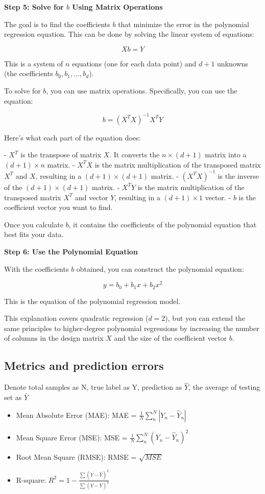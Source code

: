 \documentclass[letterpaper,12pt]{article}
\begin{document}
\textbf{Step 5: Solve for $b$ Using Matrix Operations}

The goal is to find the coefficients $b$ that minimize the error in the
polynomial regression equation. This can be done by solving the linear system
of equations:

\[
    Xb = Y
\]

This is a system of $n$ equations (one for each data point) and $d+1$ unknowns
(the coefficients $b_0, b_1, \ldots, b_d$).

To solve for $b$, you can use matrix operations. Specifically, you can use the
equation:

\[
    b = (X^TX)^{-1}X^TY
\]

Here's what each part of the equation does:

- $X^T$ is the transpose of matrix $X$. It converts the $n \times (d+1)$ matrix into a $(d+1) \times n$ matrix.
- $X^TX$ is the matrix multiplication of the transposed matrix $X^T$ and $X$, resulting in a $(d+1) \times (d+1)$ matrix.
- $(X^TX)^{-1}$ is the inverse of the $(d+1) \times (d+1)$ matrix.
- $X^TY$ is the matrix multiplication of the transposed matrix $X^T$ and vector $Y$, resulting in a $(d+1) \times 1$ vector.
- $b$ is the coefficient vector you want to find.

Once you calculate $b$, it contains the coefficients of the polynomial equation
that best fits your data.

\textbf{Step 6: Use the Polynomial Equation}

With the coefficients $b$ obtained, you can construct the polynomial equation:

\[
    y = b_0 + b_1x + b_2x^2
\]

This is the equation of the polynomial regression model.

This explanation covers quadratic regression ($d=2$), but you can extend the
same principles to higher-degree polynomial regressions by increasing the
number of columns in the design matrix $X$ and the size of the coefficient
vector $b$.

\subsection{Metrics and prediction errors}

Denote total samples as N, true label as Y, prediction as $\hat{Y}$, the
average of testing set as $\bar{Y}$

\begin{itemize}
    \item Mean Absolute Error (MAE): MAE = $\frac{1}{N}\sum_{n}^{N}|Y_n-\hat{Y}_n|$
    \item Mean Square Error (MSE): MSE = $\frac{1}{N}\sum_{n}^{N}(Y_n-\hat{Y}_n)^2$
    \item Root Mean Square (RMSE): RMSE = $\sqrt{MSE}$
    \item R-square: $R^2 = 1 - \frac{\sum{(Y-\hat{Y})^2}}{\sum{(Y-\bar{Y})^2}}$
\end{itemize}
\end{document}
